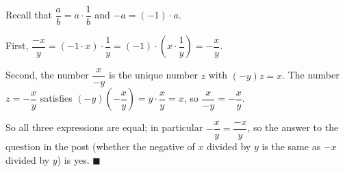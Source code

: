 Recall that $\dfrac {a}{b}=a\cdot\dfrac{1}{b}$ and $-a=(-1)\cdot a$.

First, $\dfrac{-x}{y}=(-1\cdot x)\cdot\dfrac{1}{y}=(-1)\cdot\left(x\cdot\dfrac{1}{y}\right)=-\dfrac {x}{y}$.

Second, the number $\dfrac{x}{-y}$ is the unique number $z$ with $(-y)z=x$. The number $z=-\dfrac {x}{y}$ satisfies $(-y)\left(-\dfrac {x}{y}\right)=y\cdot\dfrac {x}{y}=x$, so $\dfrac{x}{-y}=-\dfrac {x}{y}$.

So all three expressions are equal; in particular $-\dfrac {x}{y}=\dfrac{-x}{y}$, so the answer to the question in the post (whether the negative of $x$ divided by $y$ is the same as $-x$ divided by $y$) is yes. $\blacksquare$
